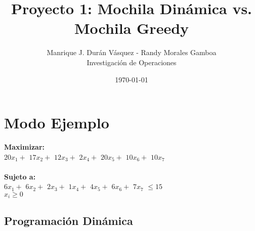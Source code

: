 \documentclass[12pt]{article}
\title{Proyecto 1: Mochila Din\'amica vs. Mochila Greedy}
\author{Manrique J. Dur\'an V\'asquez - Randy Morales Gamboa\\Investigaci\'on de Operaciones\\}
\date{\today}
\newcommand\tab[1][1cm]{\hspace*{#1}}
\begin{document}
\maketitle
\pagebreak

\section*{Modo Ejemplo}

\textbf{Maximizar:} \\
\tab$20x_{1} + $ $17x_{2} + $ $12x_{3} + $ $2x_{4} + $ $20x_{5} + $ $10x_{6} + $ $10x_{7}   $ \\\\
\textbf{Sujeto a:}\\
\tab$6x_{1} + $ $6x_{2} + $ $2x_{3} + $ $1x_{4} + $ $4x_{5} + $ $6x_{6} + $ $7x_{7}   $ $\leq 15$\\
\tab$x_i \geq 0$\subsection*{Programaci\'on Din\'amica}
\end{document}
